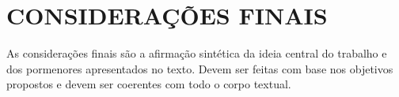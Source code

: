 \section{CONSIDERAÇÕES FINAIS}
\label{sec:consideracoes-finais}

As considerações finais são a afirmação sintética da ideia central do trabalho e dos pormenores apresentados no texto.
Devem ser feitas com base nos objetivos propostos e devem ser coerentes com todo o corpo textual.






